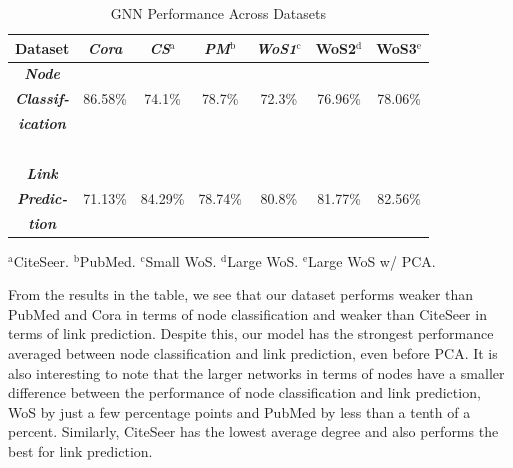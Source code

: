 \documentclass[conference]{IEEEtran}
\begin{document}
\begin{table}[htbp]
    \caption{GNN Performance Across Datasets}
    \begin{center}
        \begin{tabular}{|c|cccccc|}
        \hline
        \textbf{Dataset} & \textbf{\textit{Cora}} & \textbf{\textit{CS$^{\mathrm{a}}$}} & \textbf{\textit{PM$^{\mathrm{b}}$}} &
        \textbf{\textit{WoS1$^{\mathrm{c}}$}} & \textbf{WoS2$^{\mathrm{d}}$} & \textbf{WoS3$^{\mathrm{e}}$} \\
        \hline
        \textbf{\textit{Node}} &\ &\ &\ &\ &\ &\ \\
        \textbf{\textit{Classif-}} &
        86.58\%& 74.1\%& 78.7\%& 72.3\%& 76.96\%& 78.06\% \\
        \textbf{\textit{ication}} &\ &\ &\ &\ &\ &\ \\
        
        \ &\ &\ &\ &\ &\ &\ \\

        \textbf{\textit{Link}} &\ &\ &\ &\ &\ &\ \\
        \textbf{\textit{Predic-}} &
        71.13\%& 84.29\%& 78.74\%& 80.8\%& 81.77\%& 82.56\% \\
        \textbf{\textit{tion}} &\ &\ &\ &\ &\ &\ \\

        \hline
        \end{tabular}
        \label{tab1}
        {$^{\mathrm{a}}$CiteSeer.}
        {$^{\mathrm{b}}$PubMed.}
        {$^{\mathrm{c}}$Small WoS.}
        {$^{\mathrm{d}}$Large WoS.}
        {$^{\mathrm{e}}$Large WoS w/ PCA.}
    \end{center}
\end{table}

From the results in the table, we see that our dataset performs weaker than 
PubMed and Cora in terms of node classification and weaker than CiteSeer in 
terms of link prediction. Despite this, our model has the strongest performance 
averaged between node classification and link prediction, even before PCA. It is 
also interesting to note that the larger networks in terms of nodes have a smaller 
difference between the performance of node classification and link prediction, 
WoS by just a few percentage points and PubMed by less than a tenth of a percent. 
Similarly, CiteSeer has the lowest average degree and also performs the 
best for link prediction. \par 
\end{document}
